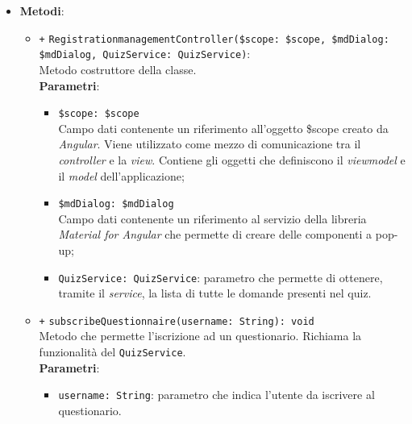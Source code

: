 \begin{itemize}
\begin{itemize}
	\end{itemize}
	\item \textbf{Metodi}:
	\begin{itemize}
		\item \texttt{+} \texttt{RegistrationmanagementController(\$scope: \$scope, \$mdDialog: \$mdDialog, QuizService: QuizService)}: \\Metodo costruttore della classe. \\
			\textbf{Parametri}:
			\begin{itemize}
					\item \texttt{\$scope: \$scope} \\
					Campo dati contenente un riferimento all'oggetto \$scope creato da \textit{Angular}. Viene utilizzato come mezzo di comunicazione tra il \textit{controller\ped{G}} e la \textit{view}. Contiene gli oggetti che definiscono il \textit{viewmodel\ped{G}} e il \textit{model} dell'applicazione;
					\item \texttt{\$mdDialog: \$mdDialog} \\
					Campo dati contenente un riferimento al servizio della libreria \textit{Material for Angular} che permette di creare delle componenti a pop-up;
					\item \texttt{QuizService: QuizService}: parametro che permette di ottenere, tramite il \textit{service}, la lista di tutte le domande presenti nel quiz. 
			\end{itemize}
		\item \texttt{+} \texttt{subscribeQuestionnaire(username: String): void} \\ Metodo che permette l'iscrizione ad un questionario. Richiama la funzionalità del \texttt{QuizService}. \\
		\textbf{Parametri}:
		\begin{itemize}
			\item \texttt{username: String}: parametro che indica l'utente da iscrivere al questionario.
		\end{itemize}
	\end{itemize}
\end{itemize}

